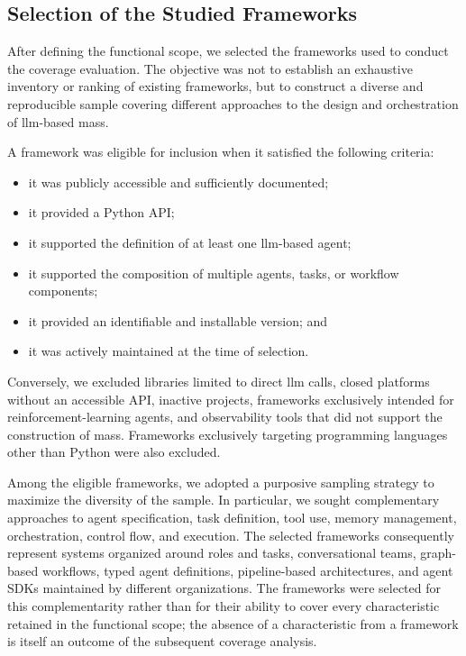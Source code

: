 \subsection{Selection of the Studied Frameworks}
\label{subsec:framework-selection}

After defining the functional scope, we selected the frameworks used to
conduct the coverage evaluation. The objective was not to establish an
exhaustive inventory or ranking of existing frameworks, but to construct a
diverse and reproducible sample covering different approaches to the design
and orchestration of \gls{llm}-based \gls{mas}s.

A framework was eligible for inclusion when it satisfied the following
criteria:

\begin{itemize}
    \item it was publicly accessible and sufficiently documented;
    \item it provided a Python API;
    \item it supported the definition of at least one \gls{llm}-based agent;
    \item it supported the composition of multiple agents, tasks, or workflow
    components;
    \item it provided an identifiable and installable version; and
    \item it was actively maintained at the time of selection.
\end{itemize}

Conversely, we excluded libraries limited to direct \gls{llm} calls, closed
platforms without an accessible API, inactive projects, frameworks exclusively
intended for reinforcement-learning agents, and observability tools that did
not support the construction of \gls{mas}s. Frameworks exclusively
targeting programming languages other than Python were also excluded.

Among the eligible frameworks, we adopted a purposive sampling strategy to
maximize the diversity of the sample. In particular, we sought complementary
approaches to agent specification, task definition, tool use, memory
management, orchestration, control flow, and execution. The selected
frameworks consequently represent systems organized around roles and tasks,
conversational teams, graph-based workflows, typed agent definitions,
pipeline-based architectures, and agent SDKs maintained by different
organizations. The frameworks were selected for this complementarity rather
than for their ability to cover every characteristic retained in the
functional scope; the absence of a characteristic from a framework is itself
an outcome of the subsequent coverage analysis.

